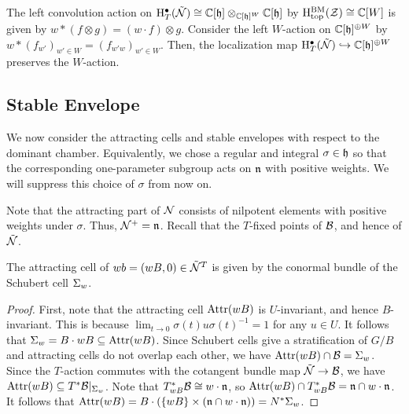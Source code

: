 \begin{lemma}{}
    The left convolution action on $\mathrm{H}^\bullet_T(\tilde{\mathcal{N}}) \cong \mathbb{C}[\mathfrak{h}] \otimes_{\mathbb{C}[\mathfrak{h}]^W} \mathbb{C}[\mathfrak{h}]$ by $\mathrm{H}^\mathrm{BM}_\mathrm{top}(\mathcal{Z}) \cong \mathbb{C}[W]$ is given by $w * (f \otimes g) = (w \cdot f) \otimes g$. Consider the left $W$-action on $\mathbb{C}[\mathfrak{h}]^{\oplus W}$ by $w * (f_{w'})_{w' \in W} = (f_{w'w})_{w' \in W}$. Then, the localization map $\mathrm{H}^\bullet_T(\tilde{\mathcal{N}}) \hookrightarrow \mathbb{C}[\mathfrak{h}]^{\oplus W}$ preserves the $W$-action.
\end{lemma}
\subsection{Stable Envelope}

We now consider the attracting cells and stable envelopes with respect to the dominant chamber. Equivalently, we chose a regular and integral $\sigma \in \mathfrak{h}$ so that the corresponding one-parameter subgroup acts on $\mathfrak{n}$ with positive weights. We will suppress this choice of $\sigma$ from now on.

Note that the attracting part of $\mathcal{N}$ consists of nilpotent elements with positive weights under $\sigma$. Thus, $\mathcal{N}^+ = \mathfrak{n}$. Recall that the $T$-fixed points of $\mathcal{B}$, and hence of $\tilde{\mathcal{N}}$.

\begin{proposition}{}
    The attracting cell of $wb = (wB, 0) \in \tilde{\mathcal{N}}^T$ is given by the conormal bundle of the Schubert cell $\Sigma_w$.
    \begin{proof}
        First, note that the attracting cell $\mathrm{Attr}(wB)$ is $U$-invariant, and hence $B$-invariant. This is because $\lim_{t \to 0} \sigma(t) u \sigma(t)^{-1} = 1$ for any $u \in U$. It follows that $\Sigma_w = B \cdot wB \subseteq \mathrm{Attr}(wB)$. Since Schubert cells give a stratification of $G/B$ and attracting cells do not overlap each other, we have $\mathrm{Attr}(wB) \cap \mathcal{B} = \Sigma_w$. Since the $T$-action commutes with the cotangent bundle map $\tilde{\mathcal{N}} \to \mathcal{B}$, we have $\mathrm{Attr}(wB) \subseteq T^*\mathcal{B}|_{\Sigma_w}$. Note that $T^*_{wB}\mathcal{B} \cong w \cdot \mathfrak{n}$, so $\mathrm{Attr}(wB) \cap T^*_{wB}\mathcal{B} = \mathfrak{n} \cap w \cdot \mathfrak{n}$. It follows that $\mathrm{Attr}(wB) = B \cdot (\{wB\} \times (\mathfrak{n} \cap w \cdot \mathfrak{n})) = N^*\Sigma_w$.
    \end{proof}
\end{proposition}

